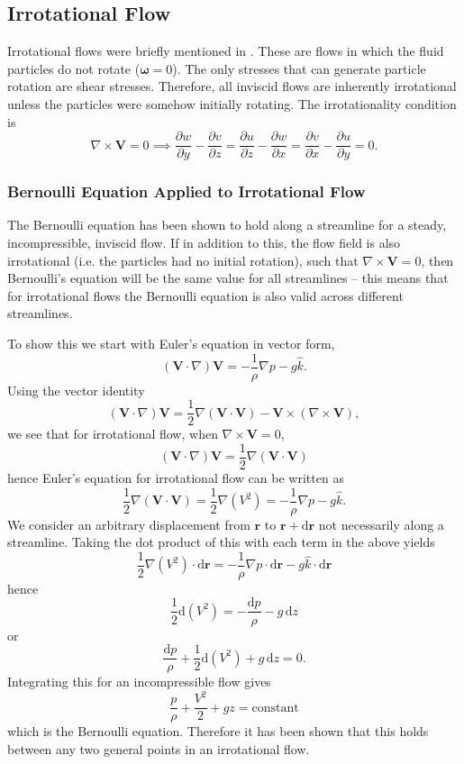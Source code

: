 \subsection{Irrotational Flow}
Irrotational flows were briefly mentioned in . These are flows in which the fluid particles do not rotate ($\boldsymbol{\omega} = 0$). The only stresses that can generate particle rotation are shear stresses. Therefore, all inviscid flows are inherently irrotational unless the particles were somehow initially rotating. The irrotationality condition is
\[ 
\nabla \times \textbf{V} = 0 \implies \frac{\partial w}{\partial y} - \frac{\partial v}{\partial z} = \frac{\partial u}{\partial z} - \frac{\partial w}{\partial x} = \frac{\partial v}{\partial x} - \frac{\partial u}{\partial y} = 0
.\]

\subsubsection{Bernoulli Equation Applied to Irrotational Flow}
The Bernoulli equation has been shown to hold along a streamline for a steady, incompressible, inviscid flow. If in addition to this, the flow field is also irrotational (i.e. the particles had no initial rotation), such that $\nabla  \times \textbf{V}= 0$, then Bernoulli's equation will be the same value for all streamlines -- this means that for irrotational flows the Bernoulli equation is also valid across different streamlines.

To show this we start with Euler's equation in vector form,
\[ 
\left( \textbf{V} \cdot \nabla  \right) \textbf{V} = - \frac{1}{\rho} \nabla p - g \hat{k}
.\]
Using the vector identity 
\[ 
\left( \textbf{V} \cdot \nabla  \right)\textbf{V} = \frac{1}{2} \nabla  \left( \textbf{V} \cdot \textbf{V} \right) - \textbf{V} \times \left( \nabla  \times \textbf{V} \right)
,\]
we see that for irrotational flow, when $\nabla  \times \textbf{V} = 0$,
\[ 
\left( \textbf{V} \cdot \nabla  \right) \textbf{V} = \frac{1}{2} \nabla  \left( \textbf{V} \cdot \textbf{V} \right)
\]
hence Euler's equation for irrotational flow can be written as
\[ 
\frac{1}{2} \nabla  \left( \textbf{V} \cdot \textbf{V} \right) = \frac{1}{2} \nabla \left( V^2 \right) = - \frac{1}{\rho} \nabla p - g \hat{k}
.\]
We consider an arbitrary displacement from $\textbf{r}$ to $\textbf{r} + \mathrm{d}\textbf{r}$ not necessarily along a streamline. Taking the dot product of this with each term in the above yields
\[ 
\frac{1}{2} \nabla \left( V^2 \right) \cdot \mathrm{d}\textbf{r} = - \frac{1}{\rho} \nabla p \cdot \mathrm{d}\textbf{r} - g \hat{k} \cdot \mathrm{d}\textbf{r}
\]
hence
\[ 
\frac{1}{2} \mathrm{d}\left( V^2 \right) = - \frac{\mathrm{d}p}{\rho} - g \, \mathrm{d}z
\]
or
\[ 
\frac{\mathrm{d}p}{\rho} + \frac{1}{2} \mathrm{d}\left( V^2 \right) + g \, \mathrm{d}z = 0
.\]
Integrating this for an incompressible flow gives
\[ 
\frac{p}{\rho} + \frac{V^2}{2} + gz = \mathrm{constant}
\]
which is the Bernoulli equation. Therefore it has been shown that this holds between any two general points in an irrotational flow. 
